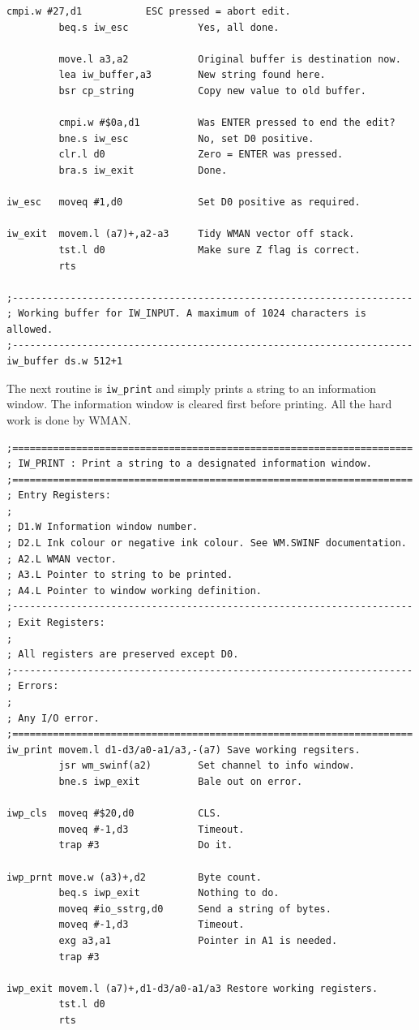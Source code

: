 \begin{lstlisting}[firstnumber=1,]
         cmpi.w #27,d1           ESC pressed = abort edit.
         beq.s iw_esc            Yes, all done.

         move.l a3,a2            Original buffer is destination now.
         lea iw_buffer,a3        New string found here.
         bsr cp_string           Copy new value to old buffer.

         cmpi.w #$0a,d1          Was ENTER pressed to end the edit?
         bne.s iw_esc            No, set D0 positive.
         clr.l d0                Zero = ENTER was pressed.
         bra.s iw_exit           Done.

iw_esc   moveq #1,d0             Set D0 positive as required.

iw_exit  movem.l (a7)+,a2-a3     Tidy WMAN vector off stack.
         tst.l d0                Make sure Z flag is correct.
         rts

;---------------------------------------------------------------------
; Working buffer for IW_INPUT. A maximum of 1024 characters is allowed.
;---------------------------------------------------------------------
iw_buffer ds.w 512+1
\end{lstlisting}

The next routine is \texttt{iw\_print} and simply prints
    a string to an information window. The information window is cleared first
    before printing. All the hard work is done by
 WMAN.

\begin{lstlisting}[firstnumber=1,]
;=====================================================================
; IW_PRINT : Print a string to a designated information window.
;=====================================================================
; Entry Registers:
;
; D1.W Information window number.
; D2.L Ink colour or negative ink colour. See WM.SWINF documentation.
; A2.L WMAN vector.
; A3.L Pointer to string to be printed.
; A4.L Pointer to window working definition.
;---------------------------------------------------------------------
; Exit Registers:
;
; All registers are preserved except D0.
;---------------------------------------------------------------------
; Errors:
;
; Any I/O error.
;=====================================================================
iw_print movem.l d1-d3/a0-a1/a3,-(a7) Save working regsiters.
         jsr wm_swinf(a2)        Set channel to info window.
         bne.s iwp_exit          Bale out on error.

iwp_cls  moveq #$20,d0           CLS.
         moveq #-1,d3            Timeout.
         trap #3                 Do it.

iwp_prnt move.w (a3)+,d2         Byte count.
         beq.s iwp_exit          Nothing to do.
         moveq #io_sstrg,d0      Send a string of bytes.
         moveq #-1,d3            Timeout.
         exg a3,a1               Pointer in A1 is needed.
         trap #3

iwp_exit movem.l (a7)+,d1-d3/a0-a1/a3 Restore working registers.
         tst.l d0
         rts
\end{lstlisting}

